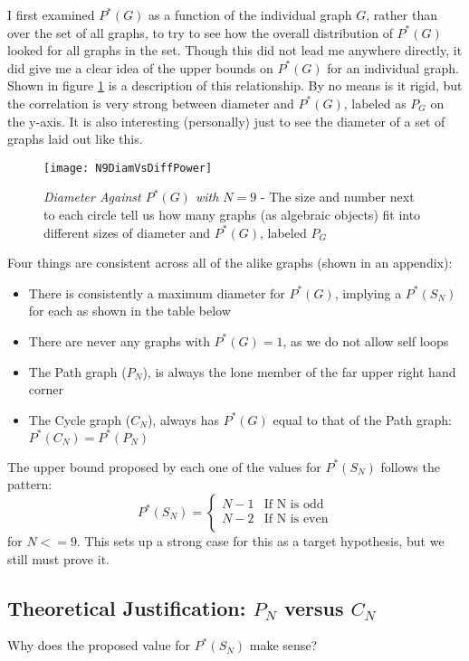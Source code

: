 I first examined $P^*(G)$ as a function of the individual graph $G$, rather than over the set of all graphs, to try to see how the overall distribution of $P^*(G)$ looked for all graphs in the set.
Though this did not lead me anywhere directly, it did give me a clear idea of the upper bounds on $P^*(G)$ for an individual graph.
Shown in figure \ref{fig:diamvsmaxpower} is a description of this relationship.  By no means is it rigid, but the correlation is very strong between diameter and $P^*(G)$, labeled as $P_G$ on the y-axis.
It is also interesting (personally) just to see the diameter of a set of graphs laid out like this.

\begin{figure}[h]
\caption{\emph{Diameter Against $P^*(G)$ with $N=9$} - The size and number next to each circle tell us how many graphs (as algebraic objects) fit into different sizes of diameter and $P^*(G)$, labeled $P_G$}
\centering
\texttt{[image: N9DiamVsDiffPower]}
\label{fig:diamvsmaxpower}
\end{figure}

Four things are consistent across all of the alike graphs (shown in an appendix):
\begin{itemize}
\item{There is consistently a maximum diameter for $P^*(G)$, implying a $P^*(S_N)$ for each as shown in the table below}
\item{There are never any graphs with $P^*(G) = 1$, as we do not allow self loops }
\item{The Path graph ($P_N$), is always the lone member of the far upper right hand corner}
\item{The Cycle graph ($C_N$), always has $P^*(G)$ equal to that of the Path graph: $P^*(C_N) = P^*(P_N)$}
\end{itemize}
The upper bound proposed by each one of the values for $P^*(S_N)$ follows the pattern:
\[ P^*(S_N) = \begin{cases} 
      N-1 & \text{If N is odd} \\
      N-2 & \text{If N is even} \\
   \end{cases}
\]
for $N <=9$. This sets up a strong case for this as a target hypothesis, but we still must prove it.

\subsection{Theoretical Justification: $P_N$ versus $C_N$}
Why does the proposed value for $P^*(S_N)$ make sense?

